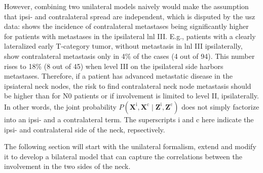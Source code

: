 \documentclass[\relativeRoot/main.tex]{subfiles}
\begin{document}
However, combining two unilateral models naively would make the assumption that ipsi- and contralateral spread are independent, which is disputed by the \gls{usz} data:  shows the incidence of contralateral metastases being significantly higher for patients with metastases in the ipsilateral \gls{lnl} III. E.g., patients with a clearly lateralized early T-category tumor, without metastasis in \gls{lnl} III ipsilaterally, show contralateral metastasis only in 4\% of the cases (4 out of 94). This number rises to 18\% (8 out of 45) when level III on the ipsilateral side harbors metastases. Therefore, if a patient has advanced metastatic disease in the ipsiateral neck nodes, the risk to find contralateral neck node metastasis should be higher than for N0 patients or if involvement is limited to level II, ipsilaterally. In other words, the joint probability $P \left( \mathbf{X}^\text{i}, \mathbf{X}^\text{c} \mid \mathbf{Z}^\text{i}, \mathbf{Z}^\text{c} \right)$ does not simply factorize into an ipsi- and a contralateral term. The superscripts $\text{i}$ and $\text{c}$ here indicate the ipsi- and contralateral side of the neck, repsectively.

The following section will start with the unilateral formalism, extend and modify it to develop a bilateral model that can capture the correlations between the involvement in the two sides of the neck.




\end{document}
